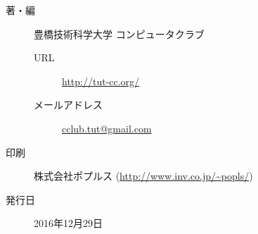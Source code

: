 \thispagestyle{empty}
\begin{flushright}
	\begin{description}
		\item[著・編] 豊橋技術科学大学 コンピュータクラブ
			\begin{description}
				\item[URL] \url{http://tut-cc.org/}
				\item[メールアドレス] \url{cclub.tut@gmail.com}
			\end{description}
		\item[印刷] 株式会社ポプルス (\url{http://www.inv.co.jp/~popls/})
		\item[発行日] 2016年12月29日
	\end{description}
\end{flushright}
